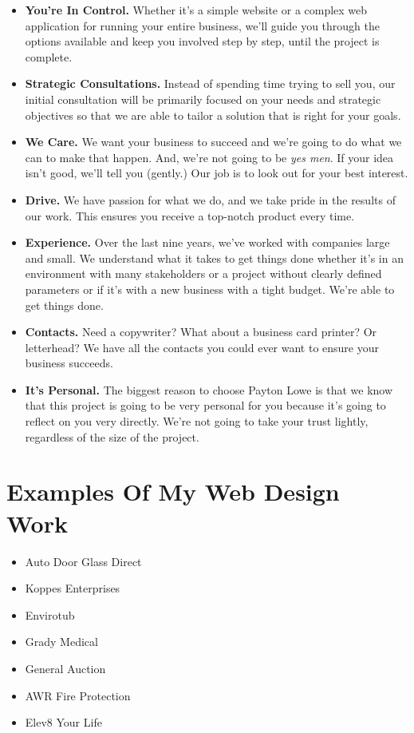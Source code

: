\documentclass[35pt]{report}
\begin{document}
		\begin{itemize}
		\item {\bfseries You're In Control.} Whether it's a simple website or a complex web application for running your entire business, we'll guide you through the options available and keep you involved step by step, until the project is complete.

		\item {\bfseries Strategic Consultations.} Instead of spending time trying to sell you, our initial consultation will be primarily focused on your needs and strategic objectives so that we are able to tailor a solution that is right for your goals.

		\item {\bfseries We Care.} We want your business to succeed and we're going to do what we can to make that happen. And, we're not going to be {\it yes men}. If your idea isn't good, we'll tell you (gently.) Our job is to look out for your best interest.

		\item {\bfseries Drive.} We have passion for what we do, and we take pride in the results of our work. This ensures you receive a top-notch product every time.

		\item {\bfseries Experience.} Over the last nine years, we've worked with companies large and small. We understand what it takes to get things done whether it's in an environment with many stakeholders or a project without clearly defined parameters or if it's with a new business with a tight budget. We're able to get things done.

		\item {\bfseries Contacts.} Need a copywriter? What about a business card printer? Or letterhead? We have all the contacts you could ever want to ensure your business succeeds.

		\item {\bfseries It's Personal.} The biggest reason to choose Payton Lowe is that we know that this project is going to be very personal for you because it's going to reflect on you very directly. We're not going to take your trust lightly, regardless of the size of the project.
		\end{itemize}

		\section{Examples Of My Web Design Work}
		\begin{itemize}
		\item Auto Door Glass Direct
		\item Koppes Enterprises
		\item Envirotub
		\item Grady Medical
		\item General Auction
		\item AWR Fire Protection
		\item Elev8 Your Life
		\end{itemize}
\end{document}
